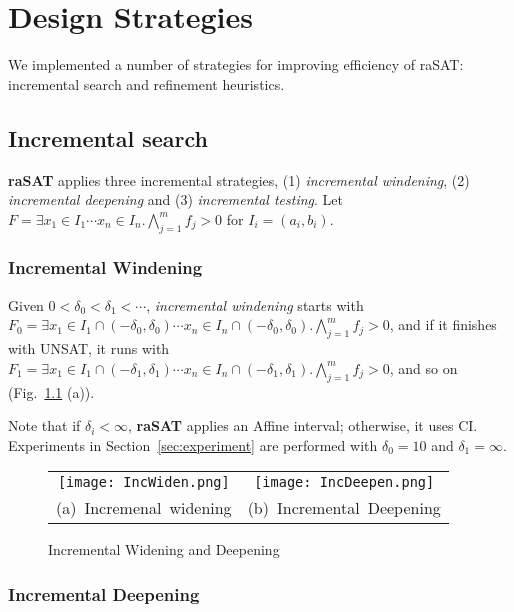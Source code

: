 \chapter{Design Strategies}
We implemented a number of strategies for improving efficiency of raSAT: incremental search and refinement heuristics.
\section{Incremental search} \label{sec:incsearch}
{\bf raSAT} applies three incremental strategies, 
(1) {\em incremental windening}, (2) {\em incremental deepening} and (3) {\em incremental testing}. 
Let
$F = \exists x_1 \in I_1 \cdots x_n \in I_n. \bigwedge \limits_{j=1}^m f_j > 0$
for $I_i = (a_i,b_i)$. %

\subsection{Incremental Windening}
Given $0 < \delta_0 < \delta_1 < \cdots$, 
{\em incremental windening} starts with 
$F_0 = \exists x_1 \in I_1 \cap (-\delta_0 , \delta_0) \cdots x_n \in I_n \cap (-\delta_0 , \delta_0). 
\bigwedge \limits_{j=1}^m f_j > 0$, 
and if it finishes with UNSAT, it runs with 
$F_1 = \exists x_1 \in I_1 \cap (-\delta_1 , \delta_1) \cdots x_n \in I_n \cap (-\delta_1 , \delta_1). 
\bigwedge \limits_{j=1}^m f_j > 0$, and so on (Fig.~\ref{fig:incwid} (a)). 

Note that if $\delta_i < \infty$, {\bf raSAT} applies an Affine interval; otherwise, 
it uses CI. 
Experiments in Section~\ref{sec:experiment} are performed 
with $\delta_0 = 10$ and $\delta_1 = \infty$.
\begin{figure}[ht]
\begin{minipage}[b]{1.0\linewidth}
\centering
\begin{tabular}{c@{\qquad}c}
\texttt{[image: IncWiden.png]} &
\texttt{[image: IncDeepen.png]} \\
\mbox{(a) Incremenal widening} & \mbox{(b) Incremental Deepening} \\
\end{tabular}
\caption{Incremental Widening and Deepening}
\label{fig:incwid}
\end{minipage}
\end{figure}


\subsection{Incremental Deepening}

